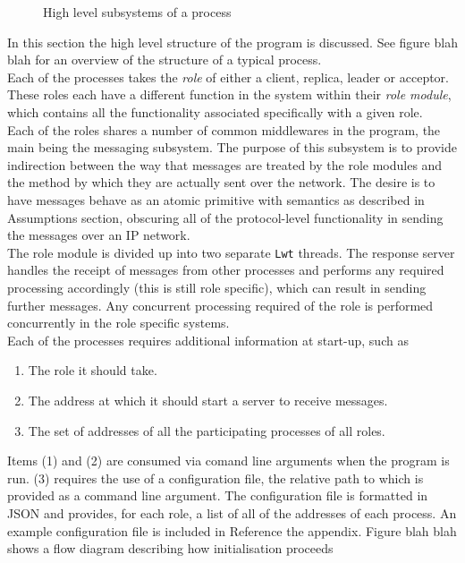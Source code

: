 \begin{figure}
{}
       \caption{High level subsystems of a process}
  \centering
\end{figure}





In this section the high level structure of the program is discussed. See figure {\color{red}blah blah} for an overview of the structure of a typical process. \\

Each of the processes takes the \emph{role} of either a client, replica, leader or acceptor. These roles each have a different function in the system within their \emph{role module}, which contains all the functionality associated specifically with a given role. \\

Each of the roles shares a number of common middlewares in the program, the main being the messaging subsystem. The purpose of this subsystem is to provide indirection between the way that messages are treated by the role modules and the method by which they are actually sent over the network. The desire is to have messages behave as an atomic primitive with semantics as described in {\color{red}Assumptions section}, obscuring all of the protocol-level functionality in sending the messages over an IP network. \\

The role module is divided up into two separate \texttt{Lwt} threads. The response server handles the receipt of messages from other processes and performs any required processing accordingly (this is still role specific), which can result in sending further messages. Any concurrent processing required of the role is performed concurrently in the role specific systems. \\

Each of the processes requires additional information at start-up, such as 

\begin{enumerate}
  \item The role it should take.
  \item The address at which it should start a server to receive messages.
  \item The set of addresses of all the participating processes of all roles.
\end{enumerate}

Items (1) and (2) are consumed via comand line arguments when the program is run. (3) requires the use of a configuration file, the relative path to which is provided as a command line argument. The configuration file is formatted in JSON and provides, for each role, a list of all of the addresses of each process. An example configuration file is included in {\color{red}Reference the appendix}. {\color{red}Figure blah blah shows a flow diagram describing how initialisation proceeds} \\

